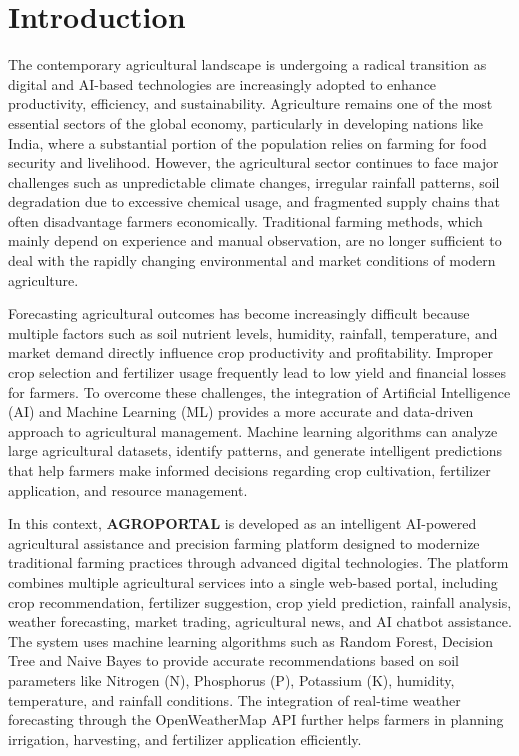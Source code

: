 
\section{Introduction}

The contemporary agricultural landscape is undergoing a radical transition as digital and AI-based technologies are increasingly adopted to enhance productivity, efficiency, and sustainability. Agriculture remains one of the most essential sectors of the global economy, particularly in developing nations like India, where a substantial portion of the population relies on farming for food security and livelihood. However, the agricultural sector continues to face major challenges such as unpredictable climate changes, irregular rainfall patterns, soil degradation due to excessive chemical usage, and fragmented supply chains that often disadvantage farmers economically. Traditional farming methods, which mainly depend on experience and manual observation, are no longer sufficient to deal with the rapidly changing environmental and market conditions of modern agriculture.

Forecasting agricultural outcomes has become increasingly difficult because multiple factors such as soil nutrient levels, humidity, rainfall, temperature, and market demand directly influence crop productivity and profitability. Improper crop selection and fertilizer usage frequently lead to low yield and financial losses for farmers. To overcome these challenges, the integration of Artificial Intelligence (AI) and Machine Learning (ML) provides a more accurate and data-driven approach to agricultural management. Machine learning algorithms can analyze large agricultural datasets, identify patterns, and generate intelligent predictions that help farmers make informed decisions regarding crop cultivation, fertilizer application, and resource management.

In this context, \textbf{AGROPORTAL} is developed as an intelligent AI-powered agricultural assistance and precision farming platform designed to modernize traditional farming practices through advanced digital technologies. The platform combines multiple agricultural services into a single web-based portal, including crop recommendation, fertilizer suggestion, crop yield prediction, rainfall analysis, weather forecasting, market trading, agricultural news, and AI chatbot assistance. The system uses machine learning algorithms such as Random Forest, Decision Tree and Naive Bayes to provide accurate recommendations based on soil parameters like Nitrogen (N), Phosphorus (P), Potassium (K), humidity, temperature, and rainfall conditions. The integration of real-time weather forecasting through the OpenWeatherMap API further helps farmers in planning irrigation, harvesting, and fertilizer application efficiently.


